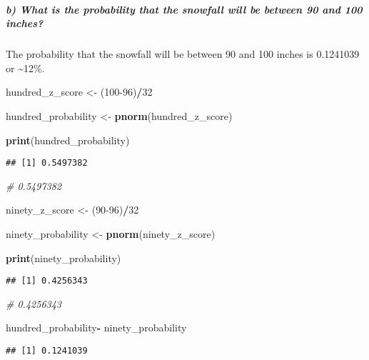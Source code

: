 \documentclass[
]{article}
\newenvironment{Shaded}{\begin{snugshade}}{\end{snugshade}}
\newcommand{\CommentTok}[1]{\textcolor[rgb]{0.56,0.35,0.01}{\textit{#1}}}
\newcommand{\DecValTok}[1]{\textcolor[rgb]{0.00,0.00,0.81}{#1}}
\newcommand{\FunctionTok}[1]{\textcolor[rgb]{0.13,0.29,0.53}{\textbf{#1}}}
\newcommand{\NormalTok}[1]{#1}
\newcommand{\OtherTok}[1]{\textcolor[rgb]{0.56,0.35,0.01}{#1}}
\newcommand{\SpecialCharTok}[1]{\textcolor[rgb]{0.81,0.36,0.00}{\textbf{#1}}}
\begin{document}
\hypertarget{b-what-is-the-probability-that-the-snowfall-will-be-between-90-and-100-inches}{%
\subparagraph{b) What is the probability that the snowfall will be
between 90 and 100
inches?}\label{b-what-is-the-probability-that-the-snowfall-will-be-between-90-and-100-inches}}

The probability that the snowfall will be between 90 and 100 inches is
0.1241039 or \textasciitilde12\%.

\begin{Shaded}
\begin{Highlighting}[]
\NormalTok{hundred\_z\_score }\OtherTok{\textless{}{-}}\NormalTok{ (}\DecValTok{100{-}96}\NormalTok{)}\SpecialCharTok{/}\DecValTok{32}

\NormalTok{hundred\_probability }\OtherTok{\textless{}{-}} \FunctionTok{pnorm}\NormalTok{(hundred\_z\_score)}

\FunctionTok{print}\NormalTok{(hundred\_probability)}
\end{Highlighting}
\end{Shaded}

\begin{verbatim}
## [1] 0.5497382
\end{verbatim}

\begin{Shaded}
\begin{Highlighting}[]
\CommentTok{\# 0.5497382}


\NormalTok{ninety\_z\_score }\OtherTok{\textless{}{-}}\NormalTok{ (}\DecValTok{90{-}96}\NormalTok{)}\SpecialCharTok{/}\DecValTok{32}

\NormalTok{ninety\_probability }\OtherTok{\textless{}{-}} \FunctionTok{pnorm}\NormalTok{(ninety\_z\_score)}

\FunctionTok{print}\NormalTok{(ninety\_probability)}
\end{Highlighting}
\end{Shaded}

\begin{verbatim}
## [1] 0.4256343
\end{verbatim}

\begin{Shaded}
\begin{Highlighting}[]
\CommentTok{\# 0.4256343}

\NormalTok{hundred\_probability}\SpecialCharTok{{-}}\NormalTok{ ninety\_probability}
\end{Highlighting}
\end{Shaded}

\begin{verbatim}
## [1] 0.1241039
\end{verbatim}
\end{document}
